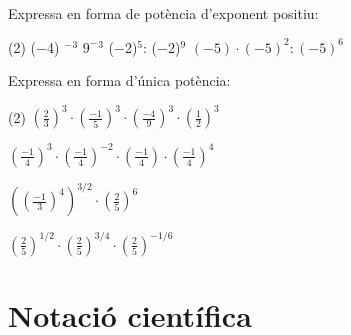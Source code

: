 \begin{mylist}
\exer  Expressa en forma de potència d'exponent positiu:  
\begin{tasks}(2)
 \task ($-$4) ${}^{-}$${}^{3 }$     \task ${9}^{-}$${}^{3}$  \task ($-$2)${}^{5}$: ($-$2)${}^{9}$  \task $(-5) \cdot (-5)^{2} : (-5)^{6}$
\end{tasks}

\exer  Expressa en forma d'única potència:
\begin{tasks}(2)
\task  $\left( \frac23 \right)^{3 } \cdot \left( \frac{-1}{5} \right)^{3} \cdot \left( \frac{-4}{9} \right)^{3} \cdot \left( \frac{1}{2} \right)^{3}$    

\task  
$\left( \frac{-1}{4} \right)^3\cdot \left( \frac{-1}{4} \right)^{-2}\cdot \left( \frac{-1}{4} \right)\cdot \left( \frac{-1}{4} \right)^4$

\task $\left( \left( \frac{-1}{3} \right)^4 \right)^{3/2} \cdot \left( \frac{2}{5} \right)^{6}$

\task  $\left( \frac{2}{5} \right)^{1/2}\cdot \left( \frac{2}{5} \right)^{3/4}\cdot \left( \frac{2}{5} \right)^{-1/6}$
\end{tasks}
\answers[cols=2]{[$\left(\frac{4}{135}\right)^3$, $\left(-\frac{1}{4}\right)^6$, $\left(\frac{-2}{15}\right)^6$, $\left(\frac{2}{5}\right)^{12/12}=\frac{2}{5}$]}
\end{mylist}



\section{Notació científica}

